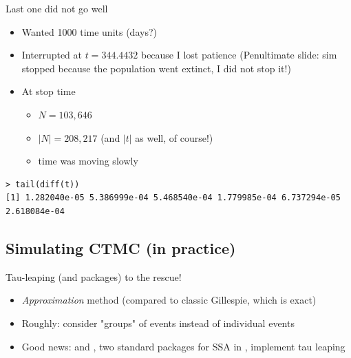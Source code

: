 \documentclass[aspectratio=169]{beamer}\usepackage[]{graphicx}\usepackage[]{xcolor}
\begin{document}


\begin{frame}[fragile]{Last one did not go well}
    \begin{itemize}
        \item Wanted 1000 time units (days?)
        \item Interrupted at $t=344.4432$ because I lost patience
        \newline (Penultimate slide: sim stopped because the population went extinct, I did not stop it!)
        \item At stop time
        \begin{itemize}
            \item $N = 103,646$
            \item $|N| = 208,217$ (and $|t|$ as well, of course!)
            \item time was moving slowly
        \end{itemize}
    \end{itemize}
    \vfill
    \begin{lstlisting}
> tail(diff(t))
[1] 1.282040e-05 5.386999e-04 5.468540e-04 1.779985e-04 6.737294e-05 2.618084e-04
    \end{lstlisting}
\end{frame}



\subsection{Simulating CTMC (in practice)}

\begin{frame}{Tau-leaping (and packages) to the rescue!}
    \begin{itemize}
        \item \emph{Approximation} method (compared to classic Gillespie, which is exact)
        \item Roughly: consider "groups" of events instead of individual events
        \item Good news:  and , two standard packages for SSA in , implement tau leaping
    \end{itemize}
\end{frame}
\end{document}
